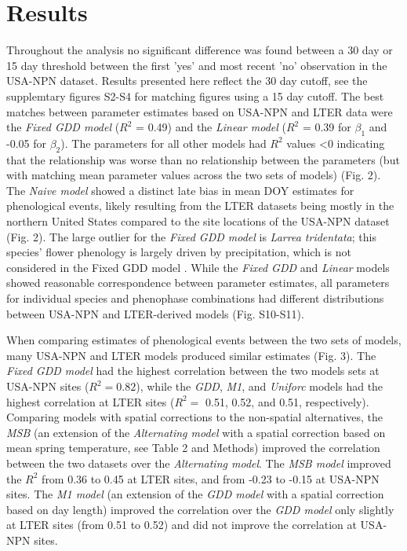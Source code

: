 \documentclass[fleqn,12pt,lineno]{article}
\begin{document}
\section*{Results}

Throughout the analysis no significant difference was found between a 30 day or 15 day threshold between the first 'yes' and most recent 'no' observation in the USA-NPN dataset. Results presented here reflect the 30 day cutoff, see the supplemtary figures S2-S4 for matching figures using a 15 day cutoff. The best matches between parameter estimates based on USA-NPN and LTER data were the \textit{Fixed GDD model} ($R^2$ = 0.49) and the \textit{Linear model} ($R^2$ = 0.39 for $\beta_{1}$ and -0.05 for $\beta_{2}$). The parameters for all other models had $R^2$ values \textless 0 indicating that the relationship was worse than no relationship between the parameters (but with matching mean parameter values across the two sets of models) (Fig. 2). The \textit{Naive model} showed a distinct late bias in mean DOY estimates for phenological events, likely resulting from the LTER datasets being mostly in the northern United States compared to the site locations of the USA-NPN dataset (Fig. 2). The large outlier for the \textit{Fixed GDD model} is \textit{Larrea tridentata}; this species' flower phenology is largely driven by precipitation, which is not considered in the Fixed GDD model \citep{beatley1974}. While the \textit{Fixed GDD} and \textit{Linear} models showed reasonable correspondence between parameter estimates, all parameters for individual species and phenophase combinations had different distributions between USA-NPN and LTER-derived models (Fig. S10-S11).

When comparing estimates of phenological events between the two sets of models, many USA-NPN and LTER models produced similar estimates (Fig. 3). The \textit{Fixed GDD model} had the highest correlation between the two models sets at USA-NPN sites ($R^2 = 0.82$), while the \textit{GDD}, \textit{M1}, and \textit{Uniforc} models had the highest correlation at LTER sites ($R^2 =$ 0.51, 0.52, and 0.51, respectively). Comparing models with spatial corrections to the non-spatial alternatives, the \textit{MSB} (an extension of the \textit{Alternating model} with a spatial correction based on mean spring temperature, see Table 2 and Methods) improved the correlation between the two datasets over the \textit{Alternating model}. The \textit{MSB model} improved the $R^2$ from 0.36 to 0.45 at LTER sites, and from -0.23 to -0.15 at USA-NPN sites. The \textit{M1 model} (an extension of the \textit{GDD model} with a spatial correction based on day length) improved the correlation over the \textit{GDD model} only slightly at LTER sites (from 0.51 to 0.52) and did not improve the correlation at USA-NPN sites. 
\end{document}
